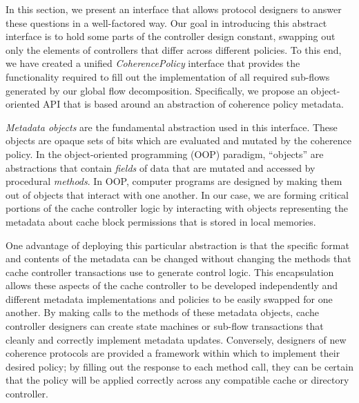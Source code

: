 In this section, we present an interface that allows protocol designers to answer these questions
in a well-factored way.
Our goal in introducing this abstract interface is to hold some parts of the controller design constant,
swapping out only the elements of controllers that differ across different policies.
To this end, we have created a unified \emph{CoherencePolicy} interface
that provides the functionality required to fill out the implementation of
all required sub-flows generated by our global flow decomposition.
Specifically, we propose an object-oriented API that is
based around an abstraction of coherence policy metadata.

\emph{Metadata objects} are the fundamental abstraction used in this interface.
These objects are opaque sets of bits which are evaluated and mutated by the coherence policy.
In the object-oriented programming (OOP) paradigm, ``objects'' are abstractions that contain \emph{fields} of data that are mutated and accessed by procedural \emph{methods}.
In OOP, computer programs are designed by making them out of objects that interact with one another.
In our case, we are forming critical portions of the cache controller logic by interacting with objects representing
the metadata about cache block permissions that is stored in local memories.

One advantage of deploying this particular abstraction is that
the specific format and contents of the metadata can be changed without changing the methods that cache controller transactions
use to generate control logic.
This encapsulation allows these aspects of the cache controller to be developed independently
and different metadata implementations and policies to be easily swapped for one another.
By making calls to the methods of these metadata objects, cache controller designers can
create state machines or sub-flow transactions
that cleanly and correctly implement metadata updates. 
Conversely, designers of new coherence protocols are provided a framework
within which to implement their desired policy;
by filling out the response to each method call, they can be certain that the policy
will be applied correctly across any compatible cache or directory controller.

